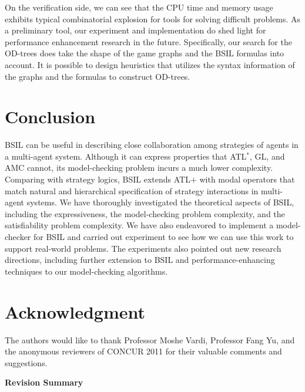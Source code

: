 \documentclass[11pt]{article}
\begin{document}
On the verification side, we can see that the CPU time and memory usage exhibits 
typical combinatorial explosion for tools for solving difficult problems.  
As a preliminary tool, our experiment and implementation do shed light for performance 
enhancement research in the future. 
Specifically, our search for the OD-trees does take the shape of the game graphs and the BSIL formulas 
into account.  
It is possible to design heuristics that utilizes the syntax information 
of the graphs and the formulas to construct OD-trees.  




\section{Conclusion \label{sec.conc}}

BSIL can be useful in describing close collaboration among strategies of 
agents in a multi-agent system. 
Although it can express properties that
ATL$^*$, GL, and AMC cannot, its model-checking problem incurs a
much lower complexity.  
Comparing with strategy logics, BSIL extends ATL$+$ with modal operators  
that match natural and hierarchical specification of strategy interactions in multi-agent systems.  
We have thoroughly investigated the theoretical aspects of BSIL, including 
the expressiveness, the model-checking problem complexity, and the satisfiability problem complexity. 
We have also endeavored to implement a model-checker for BSIL and carried out experiment to 
see how we can use this work to support real-world problems.  
The experiments also pointed out new research directions, including 
further extension to BSIL and 
performance-enhancing techniques to our model-checking algorithms.  

\section*{Acknowledgment}
The authors would like to thank Professor Moshe Vardi, Professor Fang Yu, and the anonymous reviewers of CONCUR 2011 for their valuable comments and suggestions. 





% 



\newpage
\appendix 
\begin{center} 
\bf\LARGE Revision Summary 
\end{center} 
\end{document}
